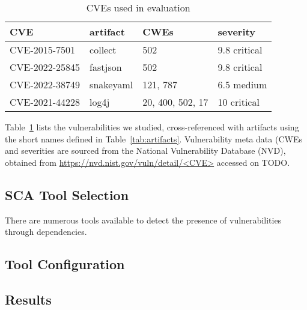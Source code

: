 \begin{table}
	\begin{tabular}{|p{3cm}p{2cm}p{2.4cm}p{2.2cm}|}
		\hline
		CVE & artifact & CWEs  & severity  \\ 
		\hline
		CVE-2015-7501 & collect &  502  &  9.8 critical \\
	    CVE-2022-25845 & fastjson  & 502  & 9.8  critical \\
		CVE-2022-38749 & snakeyaml & 121, 787  &  6.5 medium \\
		CVE-2021-44228 & log4j & 20, 400, 502, 17 & 10  critical \\
		\hline
		
		\hline
	\end{tabular}
	\caption{\label{tab:cves}CVEs used in evaluation}
\end{table}


Table~\ref{tab:cves} lists the vulnerabilities we studied, cross-referenced with artifacts using the short names defined in Table~\ref{tab:artifacts}. Vulnerability meta data (CWEs and severities are sourced from the National Vulnerability Database (NVD), obtained from \url{https://nvd.nist.gov/vuln/detail/<CVE>} accessed on TODO.


\subsection{SCA Tool Selection}


There are numerous tools available to detect the presence of vulnerabilities through dependencies. 



\subsection{Tool Configuration}


\subsection{Results}